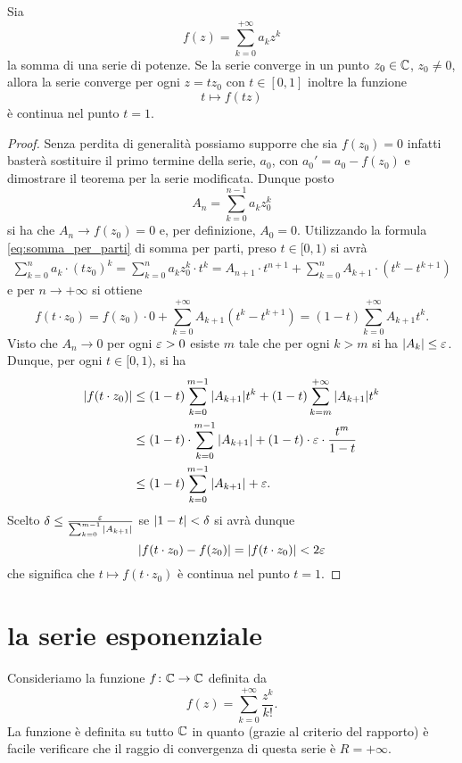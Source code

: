 \begin{theorem}
\mymark{*}%
\label{th:lemma_abel}%
%
%
Sia
\[
  f(z) = \sum_{k=0}^{+\infty} a_k z^k
\]
la somma di una serie di potenze. Se la serie converge in un punto $z_0\in {\mathbb C}$, $z_0\neq 0$, allora la serie converge per ogni $z=t z_0$ con $t\in [0,1]$ inoltre la funzione
\[
  t \mapsto f(tz)
\]
è continua nel punto $t=1$.
\end{theorem}
%
\begin{proof}
Senza perdita di generalità possiamo supporre che sia $f(z_0)=0$ infatti basterà sostituire il primo termine della serie, $a_0$, con $a_0' = a_0 - f(z_0)$ e dimostrare il teorema per la serie modificata.
Dunque posto
\[
  A_n = \sum_{k=0}^{n-1} a_k z_0^k
\]
si ha che $A_n \to f(z_0) = 0$ e, per definizione, $A_0 = 0$.
Utilizzando la formula \eqref{eq:somma_per_parti} di somma per parti, preso $t\in [0,1)$
si avrà
\begin{align*}
\sum_{k=0}^n a_k \cdot (tz_0)^k
= \sum_{k=0}^n a_k z_0^k \cdot t^k
= A_{n+1} \cdot t^{n+1} + \sum_{k=0}^n A_{k+1}\cdot (t^k - t^{k+1})
\end{align*}
e per $n\to +\infty$ si ottiene
\[
  f(t\cdot z_0) = f(z_0)\cdot 0 + \sum_{k=0}^{+\infty}A_{k+1}(t^k-t^{k+1})
  = (1-t)\sum_{k=0}^{+\infty} A_{k+1} t^k.
\]
Visto che $A_n \to 0$ per ogni $\varepsilon>0$ esiste $m$ tale che per ogni $k > m$ si ha ${\left|A_k\right|} \le  \varepsilon$. Dunque, per ogni $t\in [0,1)$, si ha
\begin{align*}
{\left|f(t\cdot z_0)\right|}
 &\le (1-t)\sum_{k=0}^{m-1} {\left|A_{k+1}\right|} t^k
  + (1-t)\sum_{k=m}^{+\infty} {\left|A_{k+1}\right|} t^k \\
 &\le (1-t)\cdot \sum_{k=0}^{m-1}{\left|A_{k+1}\right|} + (1-t)\cdot \varepsilon \cdot \frac{t^{m}}{1-t} \\
 &\le (1-t)\sum_{k=0}^{m-1}{\left|A_{k+1}\right|} + \varepsilon.
\end{align*}
Scelto $\delta \le \frac{\varepsilon} {\sum_{k=0}^{m-1} {\left|A_{k+1}\right|}}$ se ${\left|1-t\right|}<\delta$ si avrà
dunque
\[
  {\left|f(t\cdot z_0)-f(z_0)\right|} = {\left|f(t\cdot z_0)\right|} < 2\varepsilon
\]
che significa che $t\mapsto f(t\cdot z_0)$ è continua nel punto $t=1$.
\end{proof}


\section{la serie esponenziale}

Consideriamo la funzione $f \colon {\mathbb C} \to {\mathbb C}$
definita da 
\begin{equation}\label{eq:def_exp}
f(z) = \sum_{k=0}^{+\infty} \frac{z^k}{k!}.
\end{equation}
La funzione è definita su tutto ${\mathbb C}$ in quanto (grazie al criterio del rapporto)
è facile verificare che il raggio di convergenza di questa serie è $R=+\infty$.


